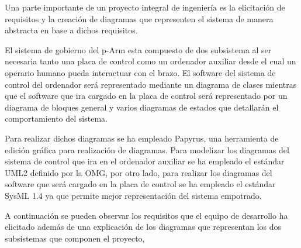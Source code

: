 Una parte importante de un proyecto integral de ingeniería es la elicitación de requisitos y la creación de diagramas que representen el sistema de manera abstracta en base a dichos requisitos.

El sistema de gobierno del p-Arm esta compuesto de dos subsistema al ser necesaria tanto una placa de control como un ordenador auxiliar desde el cual un operario humano pueda interactuar con el brazo. El software del sistema de control del ordenador será representado mediante un diagrama de clases mientras que el software que ira cargado en la placa de control será representado por un diagrama de bloques general y varios diagramas de estados que detallarán el comportamiento del sistema.

Para realizar dichos diagramas se ha empleado Papyrus, una herramienta de edición gráfica para realización de diagramas. Para modelizar los diagramas del sistema de control que ira en el ordenador auxiliar se ha empleado el estándar UML2 definido por la OMG, por otro lado, para realizar los diagramas del software que será cargado en la placa de control se ha empleado el estándar SysML 1.4 ya que permite mejor representación del sistema empotrado.

A continuación se pueden observar los requisitos que el equipo de desarrollo ha elicitado además de una explicación de los diagramas que representan los dos subsistemas que componen el proyecto,



